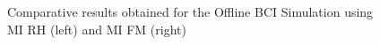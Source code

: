 \documentclass[aspectratio=169]{beamer}
\begin{document}
    \begin{frame}
   \begin{figure}[thpb]
      \centering
      \setlength\fboxsep{0pt}
	  \setlength\fboxrule{0.5pt}
      \caption{\centering Comparative results obtained for the Offline BCI Simulation using MI RH (left) and MI FM (right)}
      \label{figure3}
   \end{figure}  
    \end{frame}
    
\end{document}
